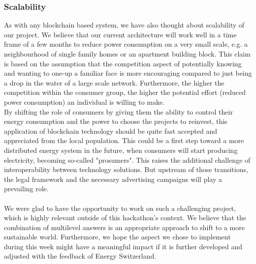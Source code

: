\documentclass[11pt]{article}
\begin{document}
\subsubsection{Scalability}
As with any blockchain based system, we have also thought about scalability of our project. We believe that our current architecture will work well in a time frame of a few months to reduce power consumption on a very small scale, e.g. a neighbourhood of single family homes or an apartment building block. This claim is based on the assumption that the competition aspect of potentially knowing and wanting to one-up a familiar face is more encouraging compared to just being a drop in the water of a large scale network. Furthermore, the higher the competition within the consumer group, the higher the potential effort (reduced power consumption) an individual is willing to make.\\
By shifting the role of consumers by giving them the ability to control their energy consumption and the power to choose the projects to reinvest, this  application of blockchain technology should be quite fast accepted and appreciated from the local population. This could be a first step toward a more distributed energy system in the future, when consumers will start producing electricity, becoming so-called "prosumers". This raises the additional challenge of interoperability between technology solutions. But upstream of those transitions, the legal framework and the necessary advertising campaigns will play a prevailing role.\cite{25}\\\\
We were glad to have the opportunity to work on such a challenging project, which is highly relevant outside of this hackathon's context. We believe that the combination of multilevel answers is an appropriate approach to shift to a more sustainable world. Furthermore, we hope the aspect we chose to implement during this week might have a meaningful impact if it is further developed and adjusted with the feedback of Energy Switzerland.
\end{document}
